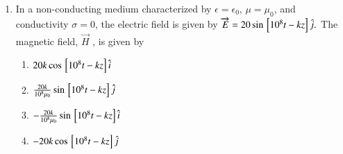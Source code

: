 \documentclass[journal,9pt,onecolumn]{IEEEtran}
\begin{document}
\begin{enumerate}
\item In a non-conducting medium characterized by $\epsilon = \epsilon_0$, $\mu = \mu_0$, and conductivity $\sigma = 0$, the electric field  is given by $\overrightarrow{E} = 20 \sin {}\left[10^8 t - kz \right] \hat{j}.$ The magnetic field, $\overrightarrow{H}$ , is given by
\begin{multicols}{2}
\begin{enumerate}
    \item $20k \cos {}\left[10^8 t - kz \right] \hat{i}$
    \item $\frac{20k}{10^8 \mu_0} \sin {}\left[10^8 t - kz \right] \hat{j}$
    \item $-\frac{20k}{10^8 \mu_0} \sin {}\left[10^8 t - kz \right] \hat{i}$
    \item $-20k \cos {}\left[10^8 t - kz \right] \hat{j}$
\end{enumerate}
\end{multicols}


\end{enumerate}
\end{document}
